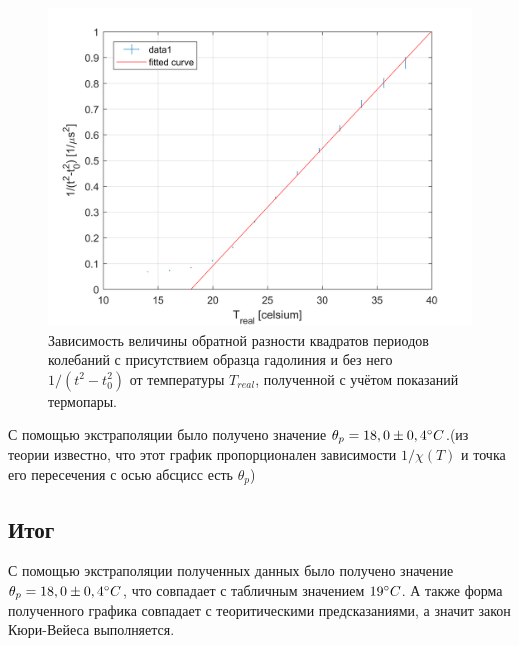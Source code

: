 \documentclass[a4paper,12pt]{article}
\begin{document}
\begin{figure}[ht!]
\centering
\includegraphics[width=160mm]{Plot1.png}
\caption{Зависимость величины обратной разности квадратов периодов колебаний с присутствием образца гадолиния и без него $1/(t^2-t_0^2)$ от температуры $T_{real}$, полученной с учётом показаний термопары.}
\label{graph1}
\end{figure}

С помощью экстраполяции было получено значение $\theta_p = 18,0 \pm 0,4 \degree C$.(из теории известно, что этот график пропорционален зависимости $1/\chi(T)$ и точка его пересечения с осью абсцисс есть $\theta_p$)

\bigskip
\subsection*{Итог}
\bigskip
 
 С помощью экстраполяции полученных данных было получено значение $\theta_p = 18,0 \pm 0,4 \degree C$, что совпадает с табличным значением $19 \degree C$. А также форма полученного графика совпадает с теоритическими предсказаниями, а значит закон Кюри-Вейеса выполняется.
 
\end{document}
